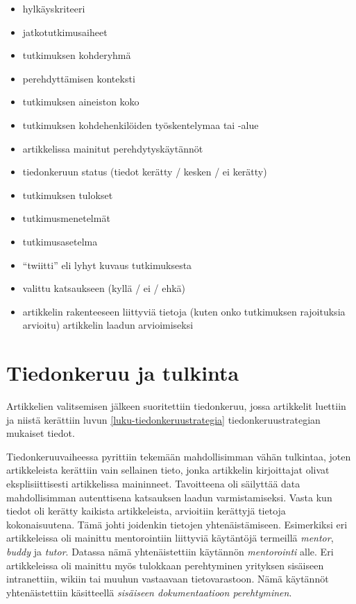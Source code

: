 \documentclass[utf8]{gradu3}
\begin{document}
\begin{itemize}
    \item hylkäyskriteeri
    \item jatkotutkimusaiheet
    \item tutkimuksen kohderyhmä
    \item perehdyttämisen konteksti
    \item tutkimuksen aineiston koko
    \item tutkimuksen kohdehenkilöiden työskentelymaa tai -alue
    \item artikkelissa mainitut perehdytyskäytännöt
    \item tiedonkeruun status (tiedot kerätty / kesken / ei kerätty)
    \item tutkimuksen tulokset
    \item tutkimusmenetelmät
    \item tutkimusasetelma
    \item ``twiitti'' eli lyhyt kuvaus tutkimuksesta
    \item valittu katsaukseen (kyllä / ei / ehkä)
    \item artikkelin rakenteeseen liittyviä tietoja (kuten onko tutkimuksen rajoituksia arvioitu) artikkelin laadun arvioimiseksi
\end{itemize}

\section{Tiedonkeruu ja tulkinta}

Artikkelien valitsemisen jälkeen suoritettiin tiedonkeruu, jossa artikkelit luettiin ja niistä kerättiin luvun \ref{luku-tiedonkeruustrategia} tiedonkeruustrategian mukaiset tiedot.

Tiedonkeruuvaiheessa pyrittiin tekemään mahdollisimman vähän tulkintaa, joten artikkeleista kerättiin vain sellainen tieto, jonka artikkelin kirjoittajat olivat eksplisiittisesti artikkelissa maininneet. Tavoitteena oli säilyttää data mahdollisimman autenttisena katsauksen laadun varmistamiseksi. Vasta kun tiedot oli kerätty kaikista artikkeleista, arvioitiin kerättyjä tietoja kokonaisuutena. Tämä johti joidenkin tietojen yhtenäistämiseen. Esimerkiksi eri artikkeleissa oli mainittu mentorointiin liittyviä käytäntöjä termeillä \textit{mentor}, \textit{buddy} ja \textit{tutor}. Datassa nämä yhtenäistettiin käytännön \textit{mentorointi} alle. Eri artikkeleissa oli mainittu myös tulokkaan perehtyminen yrityksen sisäiseen intranettiin, wikiin tai muuhun vastaavaan tietovarastoon. Nämä käytännöt yhtenäistettiin käsitteellä \textit{sisäiseen dokumentaatioon perehtyminen}.
\end{document}
